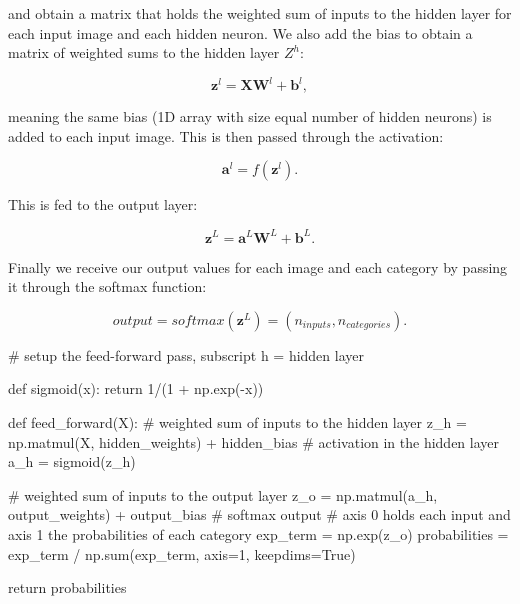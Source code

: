 \documentclass[%
oneside,                 %
final,                   %
10pt]{article}
\begin{document}
and obtain a matrix that holds the weighted sum of inputs to the hidden layer
for each input image and each hidden neuron.    
We also add the bias to obtain a matrix of weighted sums to the hidden layer $Z^{h}$:  

$$ \bm{z}^{l} = \bm{X} \bm{W}^{l} + \bm{b}^{l} ,$$

meaning the same bias (1D array with size equal number of hidden neurons) is added to each input image.  
This is then passed through the activation:  

$$ \bm{a}^{l} = f(\bm{z}^l) .$$  

This is fed to the output layer:  

$$ \bm{z}^{L} = \bm{a}^{L} \bm{W}^{L} + \bm{b}^{L} .$$

Finally we receive our output values for each image and each category by passing it through the softmax function:  

$$ output = softmax (\bm{z}^{L}) = (n_{inputs}, n_{categories}) .$$





































\bpycod
# setup the feed-forward pass, subscript h = hidden layer

def sigmoid(x):
    return 1/(1 + np.exp(-x))

def feed_forward(X):
    # weighted sum of inputs to the hidden layer
    z_h = np.matmul(X, hidden_weights) + hidden_bias
    # activation in the hidden layer
    a_h = sigmoid(z_h)
    
    # weighted sum of inputs to the output layer
    z_o = np.matmul(a_h, output_weights) + output_bias
    # softmax output
    # axis 0 holds each input and axis 1 the probabilities of each category
    exp_term = np.exp(z_o)
    probabilities = exp_term / np.sum(exp_term, axis=1, keepdims=True)
    
    return probabilities
\end{document}
